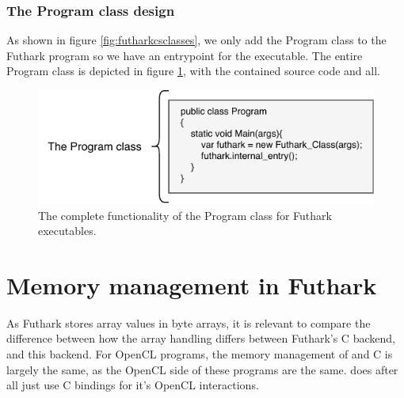 \clearpage

\subsubsection{The Program class design}
As shown in figure \ref{fig:futharkcsclasses}, we only add the Program class to
the Futhark program so we have an entrypoint for the executable.
The entire Program class is depicted in figure \ref{fig:programclass}, with the
contained source code and all.

\begin{figure}[H]
  \centering
  \includegraphics{chapters/figs/csharp/program_class.pdf}
  \caption{The complete functionality of the Program class for Futhark
    executables.}
  \label{fig:programclass}
\end{figure}

\section{Memory management in Futhark \csharp{}}
As Futhark stores array values in byte arrays, it is relevant to compare
the difference between how the array handling differs between Futhark's C
backend, and this \csharp{} backend.
For OpenCL programs, the memory management of \csharp{} and C is largely the
same, as the OpenCL side of these programs are the same. \csharp{} does after
all just use C bindings for it's OpenCL interactions.


